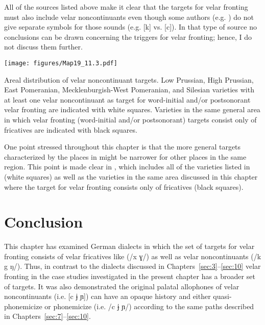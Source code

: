 All of the sources listed above make it clear that the targets for velar fronting must also include velar noncontinuants even though some authors (e.g. \citealt{Teuchert1913}) do not give separate symbols for those sounds (e.g. [k] vs. [c]). In that type of source no conclusions can be drawn concerning the triggers for velar fronting; hence, I do not discuss them further.

\begin{map}
\texttt{[image: figures/Map19\_11.3.pdf]}
\caption[Areal distribution of velar noncontinuant targets]{Areal distribution of velar noncontinuant targets. Low Prussian, High Prussian, East Pomeranian, Mecklenburgish-West Pomeranian, and Silesian varieties with at least one velar noncontinuant as target for word-initial and/or postsonorant velar fronting are indicated with white squares. Varieties in the same general area in which velar fronting (word-initial and/or postsonorant) targets consist only of fricatives are indicated with black squares.}\label{map:19}
\end{map}

One point stressed throughout this chapter is that the more general targets characterized by the places in  might be narrower for other places in the same region. This point is made clear in , which includes all of the varieties listed in  (white squares) as well as the varieties in the same area discussed in this chapter where the target for velar fronting consists only of fricatives (black squares).

\section{{Conclusion}}\label{sec:11.11}

This chapter has examined German dialects in which the set of targets for velar fronting consists of velar fricatives like (/x ɣ/) as well as velar noncontinuants (/k g ŋ/). Thus, in contrast to the dialects discussed in Chapters~\ref{sec:3}--\ref{sec:10} velar fronting in the case studies investigated in the present chapter has a broader set of targets. It was also demonstrated the original palatal allophones of velar noncontinuants (i.e. [c ɉ ɲ]) can have an opaque history and either quasi-phonemicize or phonemicize (i.e. /c ɉ ɲ/) according to the same paths described in Chapters~\ref{sec:7}--\ref{sec:10}.
